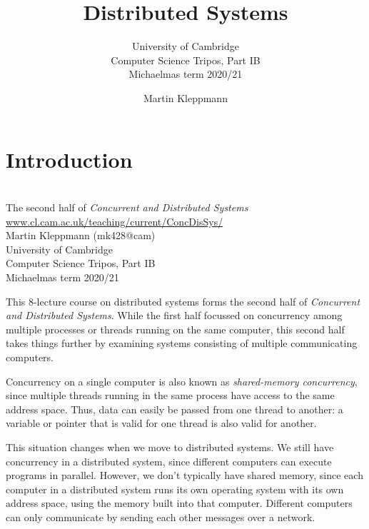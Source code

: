 
\title{Distributed Systems}
\subtitle{University of Cambridge\\Computer Science Tripos, Part IB\\Michaelmas term 2020/21}
\author{Martin Kleppmann}
\date{}
\maketitle

\section{Introduction}

\begin{frame}
    \label{s:title}
    \begin{center}
        \textbf{\huge{\color{darkblue}{Distributed Systems}}} \\[2em]
        The second half of \emph{Concurrent and Distributed Systems}\\[0.5em]
        \href{https://www.cl.cam.ac.uk/teaching/current/ConcDisSys/}{www.cl.cam.ac.uk/teaching/current/ConcDisSys/}\\[2em]
        Martin Kleppmann (mk428@cam) \\[0.5em]
        University of Cambridge \\[0.5em]
        Computer Science Tripos, Part IB \\[0.5em]
        Michaelmas term 2020/21 \\[0.5em]
    \end{center}
\end{frame}

This 8-lecture course on distributed systems forms the second half of \emph{Concurrent and Distributed Systems}.
While the first half focussed on concurrency among multiple processes or threads running on the same computer, this second half takes things further by examining systems consisting of multiple communicating computers.

Concurrency on a single computer is also known as \emph{shared-memory concurrency}, since multiple threads running in the same process have access to the same address space.
Thus, data can easily be passed from one thread to another: a variable or pointer that is valid for one thread is also valid for another.

This situation changes when we move to distributed systems.
We still have concurrency in a distributed system, since different computers can execute programs in parallel.
However, we don't typically have shared memory, since each computer in a distributed system runs its own operating system with its own address space, using the memory built into that computer.
Different computers can only communicate by sending each other messages over a network.

